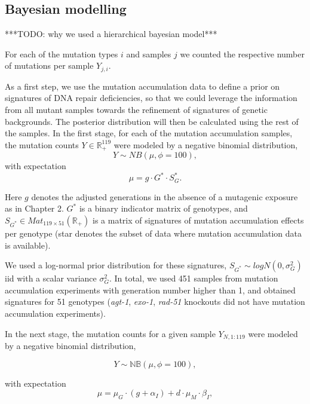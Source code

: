 \subsection{Bayesian modelling}

***TODO: why we used a hierarchical bayesian model***

For each of the mutation types $i$ and
samples $j$ we counted the respective number of mutations per sample $Y_{j,i}$.

As a first step, we use the mutation accumulation data to define a prior on signatures of DNA repair deficiencies, so that we could leverage the information from all mutant samples towards the refinement of signatures of genetic backgrounds. The posterior distribution will then be calculated using the rest of the samples. In the first stage, for each of the mutation accumulation samples, the mutation counts $Y \in \mathbb{R}_{+}^{119}$ were modeled by a negative binomial distribution,
\[Y \sim NB( \mu, \phi=100), \]
with expectation
\[ \mu = g \cdot G^{*} \cdot S_{G}^{*}.\]

Here $g$ denotes the adjusted generations in the absence of a mutagenic exposure as in Chapter 2. $G^{*}$ is a binary indicator matrix of genotypes, and $S_{G^{*}} \in Mat_{119\times51}(\mathbb{R}_{+})$ is a matrix of signatures of mutation accumulation effects per genotype (star denotes the subset of data where mutation accumulation data is available).

We used a log-normal prior distribution for these signatures, $S_{G^{*}} \sim logN(0, \sigma^{2}_{G})$ iid with a scalar variance $\sigma^{2}_{G}$. In total, we used 451 samples from mutation accumulation experiments with generation number higher than 1, and obtained signatures for 51 genotypes (\textit{agt-1}, \textit{exo-1}, \textit{rad-51} knockouts did not have mutation accumulation experiments).

In the next stage, the mutation counts for a given sample
$Y_{N,1:119}$ were modeled by a negative binomial distribution,

\[Y \sim \mathbb{NB} (\mu, \phi = 100), \]

with expectation
\[\mu = \mu_{G} \cdot (g + \alpha_{I}) + d \cdot \mu_{M} \cdot \beta_{I},\]

